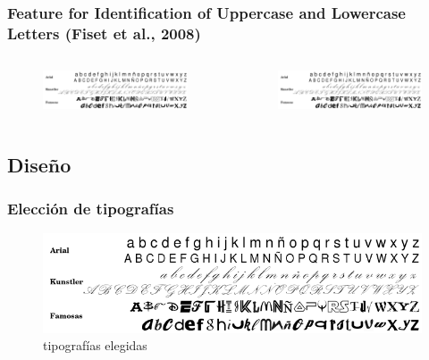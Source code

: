 \documentclass{beamer}
\begin{document}
\begin{frame}
\frametitle{Feature for Identification of Uppercase and Lowercase Letters (Fiset et al., 2008)}

\begin{columns}[t]
  \begin{figure}
    \includegraphics[scale=.10]{graficos/letras.png}
  \end{figure}
   \begin{figure}
    \includegraphics[scale=.1]{graficos/letras.png}
   \end{figure}
\end{columns}

\end{frame}



\subsection{Diseño}

\begin{frame}
\frametitle{Elecci\'on de tipograf\'ias}
\begin{figure}
\includegraphics[width=\textwidth]{graficos/letras.png}
\caption{tipograf\'ias elegidas}
\end{figure}
\end{frame}
\end{document}
